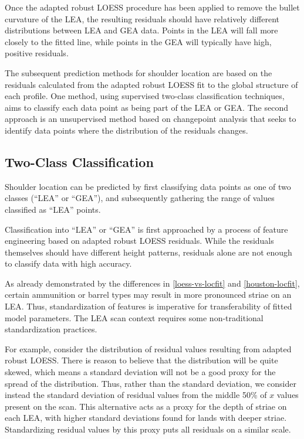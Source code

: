 \documentclass[12pt]{article}
\begin{document}
Once the adapted robust LOESS procedure has been applied to remove the
bullet curvature of the LEA, the resulting residuals should have
relatively different distributions between LEA and GEA data. Points in
the LEA will fall more closely to the fitted line, while points in the
GEA will typically have high, positive residuals.

The subsequent prediction methods for shoulder location are based on the
residuals calculated from the adapted robust LOESS fit to the global
structure of each profile. One method, using supervised two-class
classification techniques, aims to classify each data point as being
part of the LEA or GEA. The second approach is an unsupervised method
based on changepoint analysis that seeks to identify data points where
the distribution of the residuals changes.

\subsection{Two-Class Classification}

Shoulder location can be predicted by first classifying data points as
one of two classes (``LEA'' or ``GEA''), and subsequently gathering the
range of values classified as ``LEA'' points.

Classification into ``LEA'' or ``GEA'' is first approached by a process
of feature engineering based on adapted robust LOESS residuals. While
the residuals themselves should have different height patterns,
residuals alone are not enough to classify data with high accuracy.

As already demonstrated by the differences in \autoref{loess-vs-locfit}
and \autoref{houston-locfit}, certain ammunition or barrel types may
result in more pronounced striae on an LEA. Thus, standardization of
features is imperative for transferability of fitted model parameters.
The LEA scan context requires some non-traditional standardization
practices.

For example, consider the distribution of residual values resulting from
adapted robust LOESS. There is reason to believe that the distribution
will be quite skewed, which means a standard deviation will not be a
good proxy for the spread of the distribution. Thus, rather than the
standard deviation, we consider instead the standard deviation of
residual values from the middle 50\% of \(x\) values present on the
scan. This alternative acts as a proxy for the depth of striae on each
LEA, with higher standard deviations found for lands with deeper striae.
Standardizing residual values by this proxy puts all residuals on a
similar scale.
\end{document}
